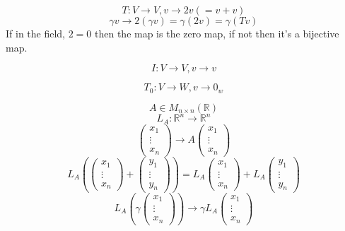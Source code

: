 \documentclass[11pt,a4paper]{colorart}
\def\l{\left}
\def\r{\right}
\def\R{\mathbb{R}}
\def\g{\gamma}
\begin{document}
\begin{example}[Dilation]
	\[ T:V \rightarrow V,v\rightarrow 2v \l(=v+v\r)\]
	\[ \g v \rightarrow 2 \l(\g v\r) = \g\l(2v\r) = \g\l(Tv\r) \]
	If in the field, $2=0$ then the map is the zero map, if not then it's a bijective map.
\end{example}

\begin{example}
	\[ I:V \rightarrow V, v\rightarrow v\]
\end{example}

\begin{example}
	\[ T_0:V\rightarrow W, v \rightarrow 0_w \]
\end{example}

\begin{example}[Matrices]
	\[ A \in M_{n\times n}\l(\R\r) \]
	\[ L_A: \R^n \rightarrow \R^n \]
	\[ \begin{pmatrix} x_1 \\ \vdots \\ x_n \end{pmatrix} 
	   \rightarrow A \begin{pmatrix} x_1 \\ \vdots \\ x_n \end{pmatrix}\]
	\[ L_A\l(\begin{pmatrix} x_1 \\ \vdots \\ x_n \end{pmatrix} + \begin{pmatrix} y_1 \\ \vdots \\ y_n \end{pmatrix} \r) = L_A \begin{pmatrix} x_1 \\ \vdots \\ x_n \end{pmatrix} + L_A \begin{pmatrix} y_1 \\ \vdots \\ y_n \end{pmatrix} \]
	\[ L_A \l(\g\begin{pmatrix} x_1 \\ \vdots \\ x_n \end{pmatrix} \r)\rightarrow \g L_A \begin{pmatrix} x_1 \\ \vdots \\ x_n \end{pmatrix}\]
\end{example}
\end{document}
